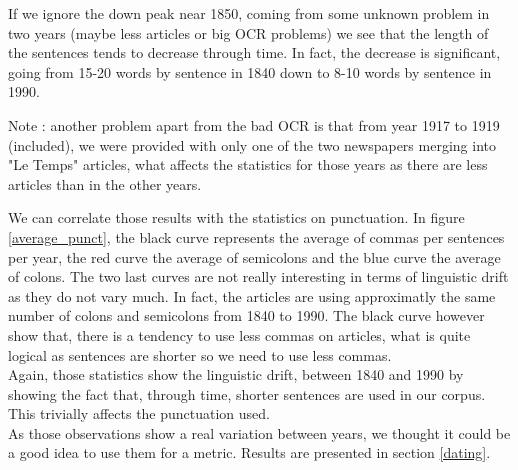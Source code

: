 If we ignore the down peak near 1850, coming from some unknown problem in two years (maybe less articles or big OCR problems) we see that the length of the sentences tends to decrease through time. In fact, the decrease is significant, going from 15-20 words by sentence in 1840 down to 8-10 words by sentence in 1990.

Note : another problem apart from the bad OCR is that from year 1917 to 1919 (included), we were provided with only one of the two newspapers merging into "Le Temps" articles, what affects the statistics for those years as there are less articles than in the other years.

We can correlate those results with the statistics on punctuation. In figure \ref{average_punct}, the black curve represents the average of commas per sentences per year, the red curve the average of semicolons and the blue curve the average of colons. The two last curves are not really interesting in terms of linguistic drift as they do not vary much. In fact, the articles are using approximatly the same number of colons and semicolons from 1840 to 1990. The black curve however show that, there is a tendency to use less commas on articles, what is quite logical as sentences are shorter so we need to use less commas.\\

Again, those statistics show the linguistic drift, between 1840 and 1990 by showing the fact that, through time, shorter sentences are used in our corpus. This trivially affects the punctuation used. \\

As those observations show a real variation between years, we thought it could be a good idea to use them for a metric. Results are presented in section \ref{dating}.
